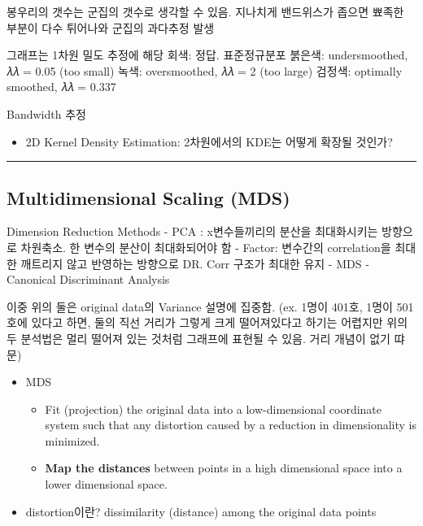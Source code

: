 \documentclass[
]{book}
\providecommand{\tightlist}{%
  \setlength{\itemsep}{0pt}\setlength{\parskip}{0pt}}
\begin{document}
{{{봉우리의 갯수는 군집의 갯수로 생각할 수 있음. 지나치게 밴드위스가 좁으면 뾰족한 부분이 다수 튀어나와 군집의 과다추정 발생

그래프는 1차원 밀도 추정에 해당
회색: 정답. 표준정규분포
붉은색: undersmoothed, 𝜆𝜆 = 0.05 (too small)
녹색: oversmoothed, 𝜆𝜆 =
2 (too large)
검정색: optimally smoothed, 𝜆𝜆 = 0.337

Bandwidth 추정

\begin{itemize}
\tightlist
\item
  2D Kernel Density Estimation: 2차원에서의 KDE는 어떻게 확장될 것인가?
\end{itemize}

\begin{center}\rule{0.5\linewidth}{0.5pt}\end{center}

\hypertarget{multidimensional-scaling-mds}{%
\subsection{Multidimensional Scaling (MDS)}\label{multidimensional-scaling-mds}}

Dimension Reduction Methods
- PCA : x변수들끼리의 분산을 최대화시키는 방향으로 차원축소. 한 변수의 분산이 최대화되어야 함
- Factor: 변수간의 correlation을 최대한 깨트리지 않고 반영하는 방향으로 DR. Corr 구조가 최대한 유지
- MDS
- Canonical Discriminant Analysis

이중 위의 둘은 original data의 Variance 설명에 집중함. (ex. 1명이 401호, 1명이 501호에 있다고 하면, 둘의 직선 거리가 그렇게 크게 떨어져있다고 하기는 어렵지만 위의 두 분석법은 멀리 떨어져 있는 것처럼 그래프에 표현될 수 있음. 거리 개념이 없기 땨문)

\begin{itemize}
\item
  MDS

  \begin{itemize}
  \tightlist
  \item
    Fit (projection) the original data into a low-dimensional coordinate system such that any distortion caused by a reduction in dimensionality is minimized.
  \item
    \textbf{Map the distances} between points in a high dimensional space into a lower dimensional space.
  \end{itemize}
\item
  distortion이란? dissimilarity (distance) among the original data points


\end{itemize}}}}
\end{document}
